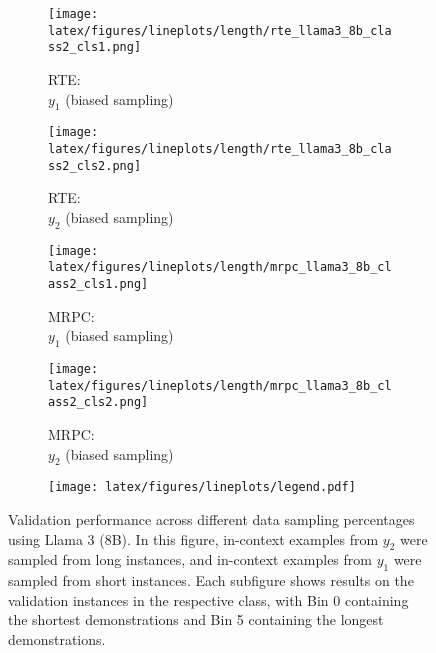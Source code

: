 \begin{figure}[t!]
    \centering
    \begin{minipage}[t]{\linewidth}
        \begin{subfigure}{0.49\linewidth}
            \centering
            \texttt{[image: latex/figures/lineplots/length/rte\_llama3\_8b\_class2\_cls1.png]}
            \caption{RTE: \\ $y_1$ (biased sampling)}\label{fig:image1}
        \end{subfigure}%
        \hfill
        \begin{subfigure}{0.49\linewidth}
            \centering
            \texttt{[image: latex/figures/lineplots/length/rte\_llama3\_8b\_class2\_cls2.png]}
            \caption{RTE: \\ $y_2$ (biased sampling)}\label{fig:image2}
        \end{subfigure}
        \hfill
        \begin{subfigure}{0.49\linewidth}
            \centering
            \texttt{[image: latex/figures/lineplots/length/mrpc\_llama3\_8b\_class2\_cls1.png]}
            \caption{MRPC: \\ $y_1$ (biased sampling)}\label{fig:image3}
        \end{subfigure}
        \hfill
        \begin{subfigure}{0.49\linewidth}
            \centering
            \texttt{[image: latex/figures/lineplots/length/mrpc\_llama3\_8b\_class2\_cls2.png]}
            \caption{MRPC: \\ $y_2$ (biased sampling)}\label{fig:image4}
        \end{subfigure}%
    \end{minipage}%
    \hfill
    \begin{minipage}[c]{\linewidth}
        \centering
        \vspace{2mm}
            \begin{subfigure}{0.7 \linewidth}
            \centering
            \texttt{[image: latex/figures/lineplots/legend.pdf]}
        \end{subfigure}%
    \end{minipage}
    \hfill
    \begin{minipage}[c]{\linewidth}
        \caption{\label{fig:len} Validation performance across different data sampling percentages using Llama 3 (8B). In this figure, in-context examples from $y_2$ were sampled from long instances, and in-context examples from $y_1$ were sampled from short instances. Each subfigure shows results on the validation instances in the respective class, with Bin 0 containing the shortest demonstrations and Bin 5 containing the longest demonstrations.}
    \end{minipage}
\end{figure}

